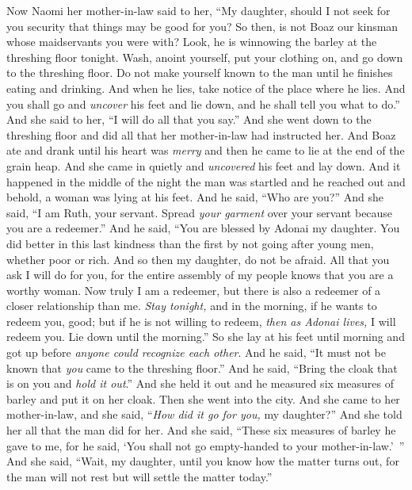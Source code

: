 \begin{biblechapter} %
 Now Naomi her mother-in-law said to her, “My daughter, should I not seek for you security that things may be good for you?
\verse So then, is not Boaz our kinsman whose maidservants you were with? Look, he is winnowing the barley at the threshing floor tonight.
\verse Wash, anoint yourself, put your clothing on, and go down to the threshing floor. Do not make yourself known to the man until he finishes eating and drinking.
\verse And when he lies, take notice of the place where he lies. And you shall go and \textit{uncover} his feet and lie down, and he shall tell you what to do.”
\verse And she said to her, “I will do all that you say.”
\verse And she went down to the threshing floor and did all that her mother-in-law had instructed her.
\verse And Boaz ate and drank until his heart was \textit{merry} and then he came to lie at the end of the grain heap. And she came in quietly and \textit{uncovered} his feet and lay down.
\verse And it happened in the middle of the night the man was startled and he reached out and behold, a woman was lying at his feet.
\verse And he said, “Who are you?” And she said, “I am Ruth, your servant. Spread \textit{your garment} over your servant because you are a redeemer.”
\verse And he said, “You are blessed by Adonai my daughter. You did better in this last kindness than the first by not going after young men, whether poor or rich.
\verse And so then my daughter, do not be afraid. All that you ask I will do for you, for the entire assembly of my people knows that you are a worthy woman.
\verse Now truly I am a redeemer, but there is also a redeemer of a closer relationship than me.
\verse \textit{Stay tonight,} and in the morning, if he wants to redeem you, good; but if he is not willing to redeem, \textit{then as Adonai lives,} I will redeem you. Lie down until the morning.”
\verse So she lay at his feet until morning and got up before \textit{anyone could recognize each other}. And he said, “It must not be known that \textit{you} came to the threshing floor.”
\verse And he said, “Bring the cloak that is on you and \textit{hold it out}.” And she held it out and he measured six measures of barley and put it on her cloak. Then she went into the city.
\verse And she came to her mother-in-law, and she said, “\textit{How did it go for you,} my daughter?” And she told her all that the man did for her.
\verse And she said, “These six measures of barley he gave to me, for he said, ‘You shall not go empty-handed to your mother-in-law.’ ”
\verse And she said, “Wait, my daughter, until you know how the matter turns out, for the man will not rest but will settle the matter today.”
\end{biblechapter}

